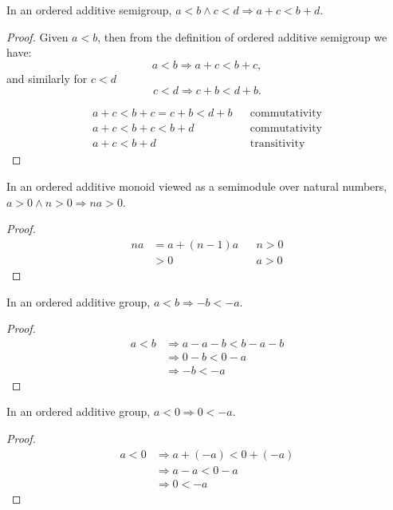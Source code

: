 \begin{lemma}
	In an ordered additive semigroup, $a < b \wedge c < d \Rightarrow a + c < b + d$.
\end{lemma}

\begin{proof}
	Given $a < b$, then from the definition of ordered additive semigroup we have:
	\[ a < b \Rightarrow a + c < b + c, \]
	and similarly for $c < d$
	\[ c < d \Rightarrow c + b < d + b. \]

	\begin{align*}
		a + c < b + c = c + b < d + b && \text{commutativity}\\
		a + c < b + c < b + d && \text{commutativity}\\
		a + c < b + d && \text{transitivity}
	\end{align*}
\end{proof}

\begin{lemma}
	In an ordered additive monoid viewed as a semimodule over natural numbers,
	$a > 0 \wedge n > 0 \Rightarrow na > 0$.
\end{lemma}

\begin{proof}
	\begin{align*}
		na &= a + (n - 1)a && n > 0\\
		   &> 0 && a > 0
	\end{align*}
\end{proof}

\begin{lemma}
	In an ordered additive group, $a < b \Rightarrow -b < -a$.
\end{lemma}

\begin{proof}
	\begin{align*}
		a < b &\Rightarrow a - a - b < b - a - b\\
		&\Rightarrow 0 - b < 0 - a\\
		&\Rightarrow -b < -a
	\end{align*}
\end{proof}

\begin{lemma}
	In an ordered additive group, $a < 0 \Rightarrow 0 < -a$.
\end{lemma}

\begin{proof}
	\begin{align*}
		a < 0 &\Rightarrow a + (-a) < 0 + (-a)\\
		&\Rightarrow a - a < 0 - a\\
		&\Rightarrow 0 < -a
	\end{align*}
\end{proof}

